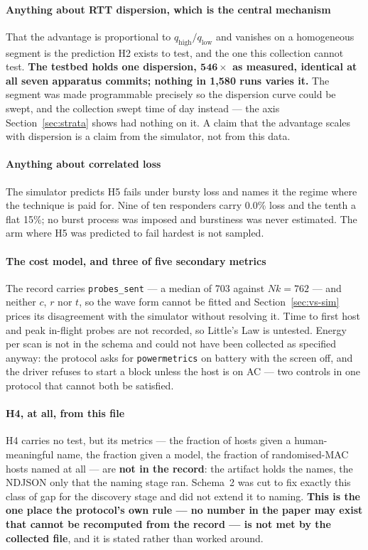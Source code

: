 \documentclass[conference]{IEEEtran}
\newcommand{\qhigh}{q_{\mathrm{high}}}
\newcommand{\qlow}{q_{\mathrm{low}}}
\begin{document}
\paragraph*{Anything about RTT dispersion, which is the central mechanism}
That the advantage is proportional to $\qhigh/\qlow$ and vanishes on a
homogeneous segment is the prediction H2 exists to test, and the one this
collection cannot test. \textbf{The testbed holds one dispersion,
$\mathbf{546\times}$ as measured, identical at all seven apparatus commits;
nothing in 1{,}580 runs varies it.} The segment was made programmable precisely
so the dispersion curve could be swept, and the collection swept time of day
instead --- the axis Section~\ref{sec:strata} shows had nothing on it. A claim
that the advantage scales with dispersion is a claim from the simulator, not
from this data.

\paragraph*{Anything about correlated loss} The simulator predicts H5 fails
under bursty loss and names it the regime where the technique is paid for. Nine
of ten responders carry 0.0\% loss and the tenth a flat 15\%; no burst process
was imposed and burstiness was never estimated. The arm where H5 was predicted
to fail hardest is not sampled.

\paragraph*{The cost model, and three of five secondary metrics} The record
carries \texttt{probes\_sent} --- a median of 703 against $Nk=762$ --- and
neither $c$, $r$ nor $t$, so the wave form cannot be fitted and
Section~\ref{sec:vs-sim} prices its disagreement with the simulator without
resolving it. Time to first host and peak in-flight probes are not recorded, so
Little's Law is untested. Energy per scan is not in the schema and could not
have been collected as specified anyway: the protocol asks for
\texttt{powermetrics} on battery with the screen off, and the driver refuses to
start a block unless the host is on AC --- two controls in one protocol that
cannot both be satisfied.

\paragraph*{H4, at all, from this file} H4 carries no test, but its metrics ---
the fraction of hosts given a human-meaningful name, the fraction given a
model, the fraction of randomised-MAC hosts named at all --- are \textbf{not in
the record}: the artifact holds the names, the NDJSON only that the naming
stage ran. Schema~2 was cut to fix exactly this class of gap for the discovery
stage and did not extend it to naming. \textbf{This is the one place the
protocol's own rule --- no number in the paper may exist that cannot be
recomputed from the record --- is not met by the collected file}, and it is
stated rather than worked around.
\end{document}
